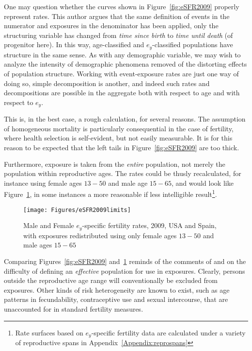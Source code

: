 One may question whether the curves shown in Figure~\ref{fig:eSFR2009} properly
represent rates. This author argues that the same definition of events in the
numerator and exposures in the denominator has been applied, only the
structuring variable has changed from \textit{time since birth} to \textit{time
until death} (of progenitor here). In this way, age-classified and
$e_y$-classified populations have structure in the same sense. As with any
demographic variable, we may wish to analyze the intensity of demographic
phenomena removed of the distorting effects of population structure.
Working with event-exposure rates are just one way of doing so, simple
decomposition is another, and indeed such rates and decompositions are possible
in the aggregate both with respect to age and with respect to
$e_y$.

This is, in the best case, a rough calculation, for several reasons. The
assumption of homogeneous mortality is particularly consequential in the case of 
fertility, where health selection is self-evident, but not easily measurable.
It is for this reason to be expected that the left tails in
Figure~\ref{fig:eSFR2009} are too thick. 

Furthermore, exposure is taken from the \textit{entire} population, not merely
the population within reproductive ages. The rates could be thusly recalculated,
for instance using female ages $13-50$ and male age $15-65$, and would look like 
Figure~\ref{fig:eSFR2009limits}, in some instances a more reasonable if less
intelligible result\footnote{Rate surfaces based on $e_y$-specific fertility
data are calculated under a variety of reproductive spans in
Appendix~\ref{Appendix:reprospans}}.

\begin{figure}[ht!]
        \centering  
          \caption{Male and Female $e_y$-specific fertility rates, 2009, USA and
          Spain, with exposures redistributed using only female ages $13-50$ and
          male ages $15-65$}
          \texttt{[image: Figures/eSFR2009limits]}
          \label{fig:eSFR2009limits}
\end{figure}

Comparing Figures~\ref{fig:eSFR2009} and~\ref{fig:eSFR2009limits} reminds of the
comments of \citet{gupta1978alternative} and \citet{mitra1976effect} on the difficulty of
defining an \textit{effective} population for use in exposures. Clearly, persons
outside the reproductive age range will conventionally be excluded from
exposures. Other kinds of risk heterogeneity are known to exist, such as age
patterns in fecundability, contraceptive use and sexual intercourse, that are
unaccounted for in standard fertility measures. 

